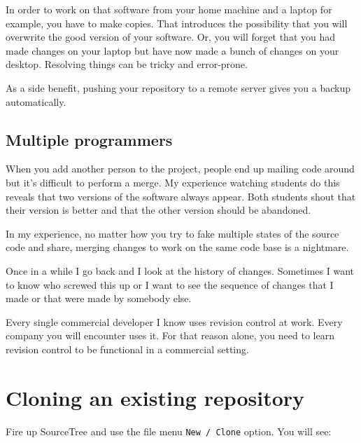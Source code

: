 \begin{fullwidth}
In order to work on that software from your home machine and a laptop for example, you have to make copies. That introduces the possibility that you will overwrite the good version of your software. Or, you will forget that you had made changes on your laptop but have now made a bunch of changes on your desktop. Resolving things can be tricky and error-prone.

As a side benefit, pushing your repository to a remote server gives you a backup automatically.

\subsection{Multiple programmers}

When you add another person to the project, people end up mailing code around but it's difficult to perform a merge. My experience watching students do this reveals that two versions of the software always appear. Both students shout that their version is better and that the other version should be abandoned.

In my experience, no matter how you try to fake multiple states of the source code and share, merging changes to work on the same code base is a nightmare.

Once in a while I go back and I look at the history of changes. Sometimes I want to know who screwed this up or I want to see the sequence of changes that I made or that were made by somebody else.

Every single commercial developer I know uses revision control at work. Every company you will encounter uses it. For that reason alone, you need to learn revision control to be functional in a commercial setting.

\section{Cloning an existing repository}

Fire up SourceTree and use the file menu {\tt New / Clone} option. You will see:
\vspace{5mm}


\end{fullwidth}
